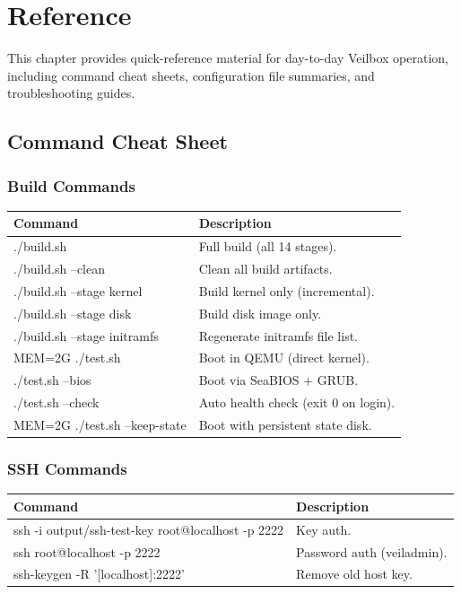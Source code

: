 \chapter{Reference}
\label{ch:reference}

This chapter provides quick-reference material for day-to-day Veilbox
operation, including command cheat sheets, configuration file summaries,
and troubleshooting guides.

\section{Command Cheat Sheet}

\subsection{Build Commands}
\begin{longtable}{|p{5cm}|p{8cm}|}
\hline
\textbf{Command} & \textbf{Description} \\
\hline
./build.sh & Full build (all 14 stages). \\
./build.sh --clean & Clean all build artifacts. \\
./build.sh --stage kernel & Build kernel only (incremental). \\
./build.sh --stage disk & Build disk image only. \\
./build.sh --stage initramfs & Regenerate initramfs file list. \\
MEM=2G ./test.sh & Boot in QEMU (direct kernel). \\
./test.sh --bios & Boot via SeaBIOS + GRUB. \\
./test.sh --check & Auto health check (exit 0 on login). \\
MEM=2G ./test.sh --keep-state & Boot with persistent state disk. \\
\hline
\end{longtable}

\subsection{SSH Commands}
\begin{longtable}{|p{5cm}|p{8cm}|}
\hline
\textbf{Command} & \textbf{Description} \\
\hline
ssh -i output/ssh-test-key root@localhost -p 2222 & Key auth. \\
ssh root@localhost -p 2222 & Password auth (veiladmin). \\
ssh-keygen -R '[localhost]:2222' & Remove old host key. \\
\hline
\end{longtable}

